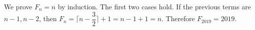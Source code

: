 We prove $F_n=n$ by induction. The first two cases hold. If the previous terms are $n-1,n-2$, then $F_n=\lceil n-\dfrac{3}{2}\rceil+1=n-1+1=n$. Therefore $\boxed{F_{2019}=2019}$.
